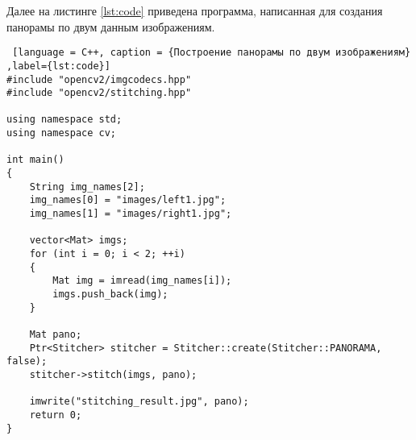 Далее на листинге \ref{lst:code} приведена программа, написанная для создания панорамы по двум данным изображениям. 

\begin{lstlisting} [language = C++, caption = {Построение панорамы по двум изображениям} ,label={lst:code}]
#include "opencv2/imgcodecs.hpp"
#include "opencv2/stitching.hpp"

using namespace std;
using namespace cv;

int main()
{
	String img_names[2];
	img_names[0] = "images/left1.jpg";
	img_names[1] = "images/right1.jpg";
	
	vector<Mat> imgs;
	for (int i = 0; i < 2; ++i)
	{
		Mat img = imread(img_names[i]);
		imgs.push_back(img);
	}
	
	Mat pano;
	Ptr<Stitcher> stitcher = Stitcher::create(Stitcher::PANORAMA, false);
	stitcher->stitch(imgs, pano);
	
	imwrite("stitching_result.jpg", pano);
	return 0;
}
\end{lstlisting}